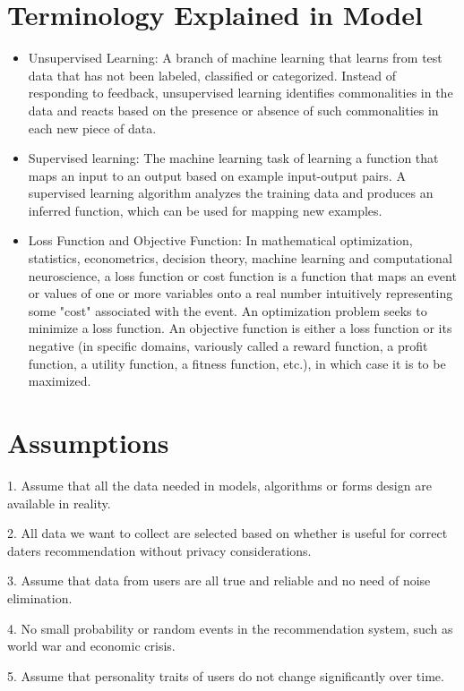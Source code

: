 \section{Terminology Explained in Model \cite{1}}      
\begin{itemize}        
	\item Unsupervised Learning: A branch of machine learning that learns from test data that has not been labeled, classified or categorized. Instead of responding to feedback, unsupervised learning identifies commonalities in the data and reacts based on the presence or absence of such commonalities in each new piece of data. 
	\item Supervised learning: The machine learning task of learning a function that maps an input to an output based on example input-output pairs. A supervised learning algorithm analyzes the training data and produces an inferred function, which can be used for mapping new examples.
	\item Loss Function and Objective Function: In mathematical optimization, statistics, econometrics, decision theory, machine learning and computational neuroscience, a loss function or cost function is a function that maps an event or values of one or more variables onto a real number intuitively representing some "cost" associated with the event. An optimization problem seeks to minimize a loss function. An objective function is either a loss function or its negative (in specific domains, variously called a reward function, a profit function, a utility function, a fitness function, etc.), in which case it is to be maximized. 

\end{itemize}


\section{Assumptions}
1. Assume that all the data needed in models, algorithms or forms design are available in reality.

2. All data we want to collect are selected based on whether is useful for correct daters recommendation without privacy considerations. 

3. Assume that data from users are all true and reliable and no need of noise elimination.

4. No small probability or random events in the recommendation system, such as world war and economic crisis.

5. Assume that personality traits of users do not change significantly over time.

